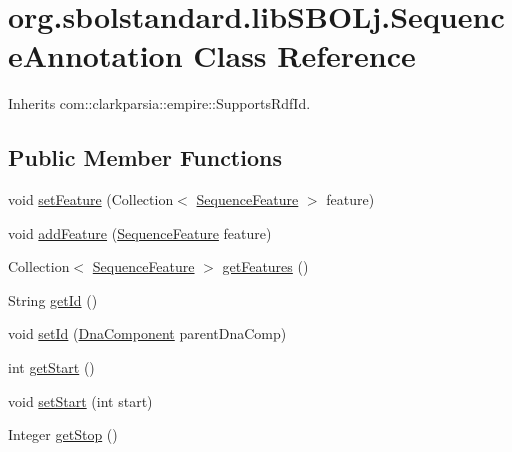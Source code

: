 \hypertarget{classorg_1_1sbolstandard_1_1lib_s_b_o_lj_1_1_sequence_annotation}{
\section{org.sbolstandard.libSBOLj.SequenceAnnotation Class Reference}
\label{classorg_1_1sbolstandard_1_1lib_s_b_o_lj_1_1_sequence_annotation}
}


Inherits com::clarkparsia::empire::SupportsRdfId.

\subsection*{Public Member Functions}
\begin{DoxyCompactItemize}
\item 
void \hyperlink{classorg_1_1sbolstandard_1_1lib_s_b_o_lj_1_1_sequence_annotation_a1b30c2534562b968dcc3f53f5322ef19}{setFeature} (Collection$<$ \hyperlink{classorg_1_1sbolstandard_1_1lib_s_b_o_lj_1_1_sequence_feature}{SequenceFeature} $>$ feature)
\item 
void \hyperlink{classorg_1_1sbolstandard_1_1lib_s_b_o_lj_1_1_sequence_annotation_a5510264f89d43dae91ffbae70142c50c}{addFeature} (\hyperlink{classorg_1_1sbolstandard_1_1lib_s_b_o_lj_1_1_sequence_feature}{SequenceFeature} feature)
\item 
Collection$<$ \hyperlink{classorg_1_1sbolstandard_1_1lib_s_b_o_lj_1_1_sequence_feature}{SequenceFeature} $>$ \hyperlink{classorg_1_1sbolstandard_1_1lib_s_b_o_lj_1_1_sequence_annotation_a44a0df68496920e6dc82a23e4cef573f}{getFeatures} ()
\item 
String \hyperlink{classorg_1_1sbolstandard_1_1lib_s_b_o_lj_1_1_sequence_annotation_a352cfd9d26e20377dee9dfe31b217b51}{getId} ()
\item 
void \hyperlink{classorg_1_1sbolstandard_1_1lib_s_b_o_lj_1_1_sequence_annotation_af9a16828c4c910b0c392f29f368cfd40}{setId} (\hyperlink{classorg_1_1sbolstandard_1_1lib_s_b_o_lj_1_1_dna_component}{DnaComponent} parentDnaComp)
\item 
int \hyperlink{classorg_1_1sbolstandard_1_1lib_s_b_o_lj_1_1_sequence_annotation_af715b30732f73f09c6ce4f201fd26f82}{getStart} ()
\item 
void \hyperlink{classorg_1_1sbolstandard_1_1lib_s_b_o_lj_1_1_sequence_annotation_addc796c0e40fd97666692bc1a8fb4ddb}{setStart} (int start)
\item 
Integer \hyperlink{classorg_1_1sbolstandard_1_1lib_s_b_o_lj_1_1_sequence_annotation_a09477cdcbc577ed67d7febdc6c88530b}{getStop} ()

\end{DoxyCompactItemize}
